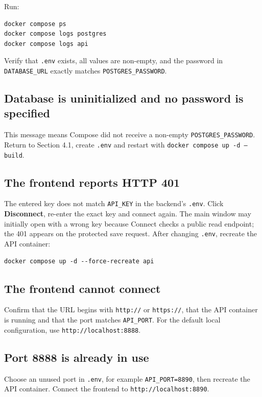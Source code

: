 \documentclass[11pt,a4paper]{article}
\begin{document}
Run:

\begin{lstlisting}
docker compose ps
docker compose logs postgres
docker compose logs api
\end{lstlisting}

Verify that \texttt{.env} exists, all values are non-empty, and the password in
\texttt{DATABASE\_URL} exactly matches \texttt{POSTGRES\_PASSWORD}.

\subsection{Database is uninitialized and no password is specified}

This message means Compose did not receive a non-empty
\texttt{POSTGRES\_PASSWORD}. Return to Section 4.1, create \texttt{.env} and
restart with \texttt{docker compose up -d --build}.

\subsection{The frontend reports HTTP 401}

The entered key does not match \texttt{API\_KEY} in the backend's
\texttt{.env}. Click \textbf{Disconnect}, re-enter the exact key and connect
again. The main window may initially open with a wrong key because Connect
checks a public read endpoint; the 401 appears on the protected save request.
After changing \texttt{.env}, recreate the API container:

\begin{lstlisting}
docker compose up -d --force-recreate api
\end{lstlisting}

\subsection{The frontend cannot connect}

Confirm that the URL begins with \texttt{http://} or \texttt{https://}, that
the API container is running and that the port matches \texttt{API\_PORT}.
For the default local configuration, use \texttt{http://localhost:8888}.

\subsection{Port 8888 is already in use}

Choose an unused port in \texttt{.env}, for example
\texttt{API\_PORT=8890}, then recreate the API container. Connect the frontend
to \texttt{http://localhost:8890}.
\end{document}
